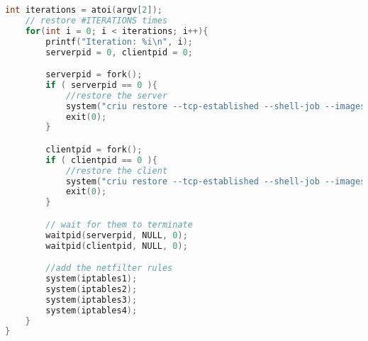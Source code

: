 \documentclass[a4paper]{article}
\begin{document}
\begin{lstlisting}[caption=Mit TCP: Launcher,language=C]
    int iterations = atoi(argv[2]);
    // restore #ITERATIONS times
    for(int i = 0; i < iterations; i++){
        printf("Iteration: %i\n", i);
        serverpid = 0, clientpid = 0;

        serverpid = fork();
        if ( serverpid == 0 ){
            //restore the server
            system("criu restore --tcp-established --shell-job --images-dir /tmp/criu/server");
            exit(0);
        }

        clientpid = fork();
        if ( clientpid == 0 ){
            //restore the client
            system("criu restore --tcp-established --shell-job --images-dir /tmp/criu/client");
            exit(0);
        }

        // wait for them to terminate
        waitpid(serverpid, NULL, 0);
        waitpid(clientpid, NULL, 0);

        //add the netfilter rules
        system(iptables1);
        system(iptables2);
        system(iptables3);
        system(iptables4);
    }
}

\end{lstlisting}
\end{document}
